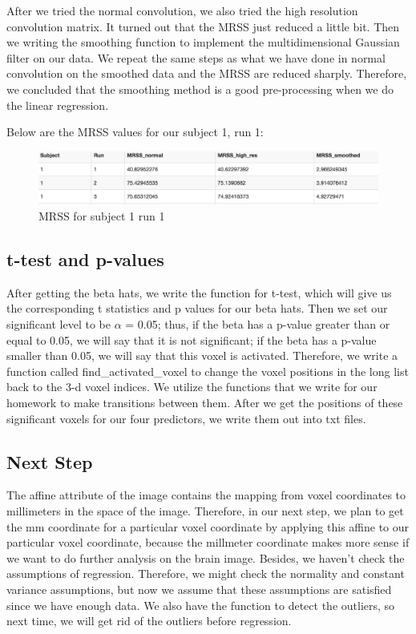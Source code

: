 \noindent
After we tried the normal convolution, we also tried the high resolution convolution matrix. It turned out that the MRSS just reduced a little bit. Then we writing the smoothing function to implement the multidimensional Gaussian filter on our data. We repeat the same steps as what we have done in normal convolution on the smoothed data and the MRSS are reduced sharply. Therefore, we concluded that the smoothing method is a good pre-processing when we do the linear regression. \newline

\noindent
Below are the MRSS values for our subject 1, run 1: \newline
\begin{figure}[H]
    \centering
        \includegraphics[scale=0.5]{../plots/mrss_result001.png}
    \caption{MRSS for subject 1 run 1}
\end{figure}


\subsection{t-test and p-values}
\noindent
After getting the beta hats, we write the function for t-test, which will give us the corresponding t statistics and p values for our beta hats. Then we set our significant level to be $\alpha$ = 0.05; thus, if the beta has a p-value greater than or equal to 0.05, we will say that it is not significant; if the beta has a p-value smaller than 0.05, we will say that this voxel is activated. \newline
\noindent Therefore, we write a function called find\_activated\_voxel to change the voxel positions in the long list back to the 3-d voxel indices. We utilize the functions that we write for our homework to make transitions between them. After we get the positions of these significant voxels for our four predictors, we write them out into txt files. \newline


\subsection{Next Step}
\noindent
The affine attribute of the image contains the mapping from voxel coordinates to millimeters in the space of the image. Therefore, in our next step, we plan to get the mm coordinate for a particular voxel coordinate by applying this affine to our particular voxel coordinate, because the millmeter coordinate makes more sense if we want to do further analysis on the brain image. \newline
Besides, we haven't check the assumptions of regression. Therefore, we might check the normality and constant variance assumptions, but now we assume that these assumptions are satisfied since we have enough data. We also have the function to detect the outliers, so next time, we will get rid of the outliers before regression. \newline


